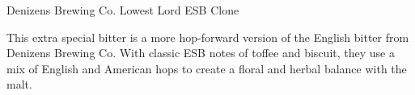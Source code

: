 \documentclass[fontsize=9pt,oneside]{scrbook}
\begin{document}
\mainmatter


\begin{recipe}{Denizens Brewing Co. Lowest Lord ESB Clone}

\begin{aboutblock}
This extra special bitter is a more hop-forward version of the English bitter
from Denizens Brewing Co. With classic ESB notes of toffee and biscuit, they use
a mix of English and American hops to create a floral and herbal balance with
the malt. \sourceaha
\end{aboutblock}


\begin{methodandtiming}
 
\begin{mashsteps}
\end{mashsteps}

\end{methodandtiming}

\recipebreak

\begin{ingredientsblock}

\begin{malts}
\end{malts}

\begin{hops}
\end{hops}


\end{ingredientsblock}

\end{recipe}

\backmatter


\end{document}
